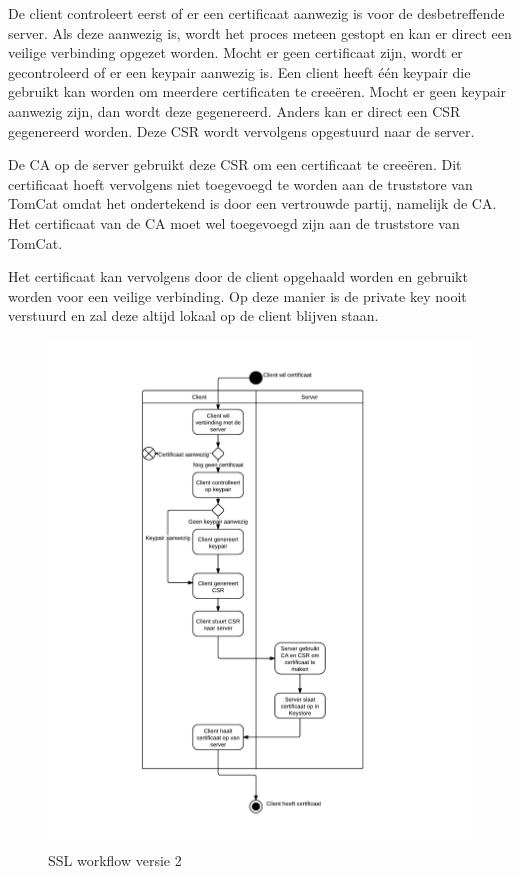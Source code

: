 \documentclass[]{article}
\begin{document}
De client controleert eerst of er een certificaat aanwezig is voor de
desbetreffende server. Als deze aanwezig is, wordt het proces meteen gestopt en
kan er direct een veilige verbinding opgezet worden. Mocht er geen certificaat
zijn, wordt er gecontroleerd of er een keypair aanwezig is. Een client heeft
\'e\'en keypair die gebruikt kan worden om meerdere certificaten te
cree\"eren. Mocht er geen keypair aanwezig zijn, dan wordt deze gegenereerd. Anders
kan er direct een CSR gegenereerd worden. Deze CSR wordt vervolgens opgestuurd
naar de server.

De CA op de server gebruikt deze CSR om een certificaat te cree\"eren. Dit
certificaat hoeft vervolgens niet toegevoegd te worden aan de truststore van
TomCat omdat het ondertekend is door een vertrouwde partij, namelijk de CA. Het
certificaat van de CA moet wel toegevoegd zijn aan de truststore van TomCat.

Het certificaat kan vervolgens door de client opgehaald worden en gebruikt
worden voor een veilige verbinding. Op deze manier is de private key nooit
verstuurd en zal deze altijd lokaal op de client blijven staan. 

\newpage

\begin{figure}[htpb]
   \begin{center}
     \includegraphics[height=0.86\textheight]{ssl_ad_2.pdf}
   \end{center}
   \caption{SSL workflow versie 2}
   \label{ssl_ad_2}
\end{figure}
\end{document}

